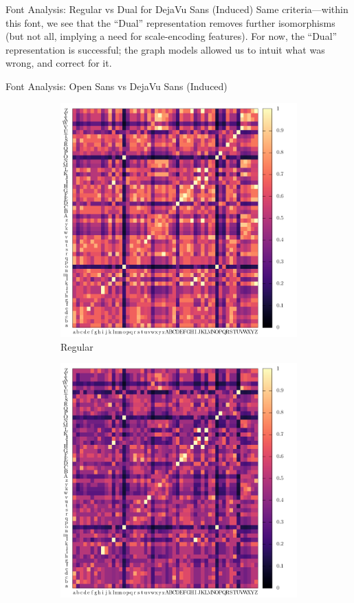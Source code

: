 \documentclass[10pt]{beamer}
\begin{document}
\begin{frame}{Font Analysis: Regular vs Dual for DejaVu Sans (Induced)}
	Same criteria---within this font, we see that the ``Dual'' representation removes further isomorphisms (but not all, implying a need for scale-encoding features).
	For now, the ``Dual'' representation is successful; \alert{the graph models allowed us to intuit what was wrong, and correct for it.}
\end{frame}

\begin{frame}{Font Analysis: Open Sans vs DejaVu Sans (Induced)}
	\begin{figure}
		\centering
		\begin{subfigure}[b]{0.4\linewidth}
			\includegraphics[width=\linewidth, height=0.9\linewidth]{../tables/open-sans-dejavu-sans/induced-conf-nrm.pdf}
			\caption{
				Regular
			}
		\end{subfigure}
		\begin{subfigure}[b]{0.4\linewidth}
			\includegraphics[width=\linewidth, height=0.9\linewidth]{../tables/dual-open-sans-dejavu-sans/induced-conf-nrm.pdf}

\end{subfigure}
\end{figure}
\end{frame}
\end{document}
